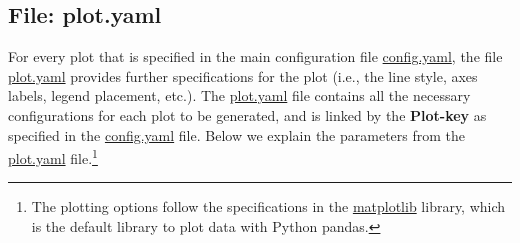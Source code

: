 \documentclass[10pt,a4paper]{article}
\begin{document}
\subsection{File: plot.yaml}

For every plot that is specified in the main configuration file \url{config.yaml}, the file \url{plot.yaml} provides further specifications for the plot (i.e., the line style, axes labels, legend placement, etc.). The \url{plot.yaml} file contains all the necessary configurations for each plot to be generated, and is linked by the \textbf{Plot-key} as specified in the \url{config.yaml} file. Below we explain the parameters from the \url{plot.yaml} file.\footnote{The plotting options follow the specifications in the \url{matplotlib} library, which is the default library to plot data with Python pandas.}
\end{document}
